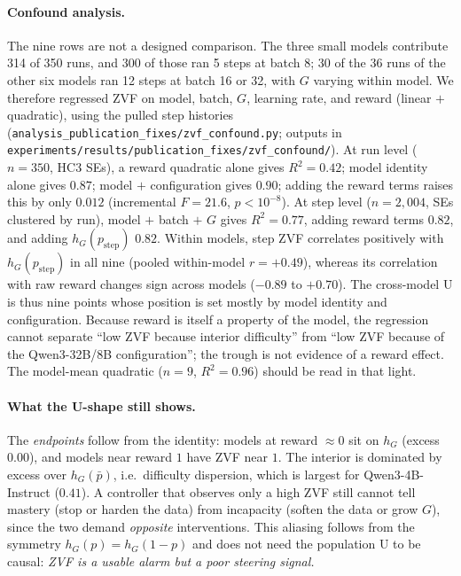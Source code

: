 \paragraph{Confound analysis.} The nine rows are not a designed comparison.
The three small models contribute 314 of 350 runs, and 300 of those ran
5 steps at batch 8; 30 of the 36 runs of the other six models ran 12 steps at
batch 16 or 32, with $G$ varying within model. We therefore regressed ZVF on
model, batch, $G$, learning rate, and reward (linear $+$ quadratic), using
the pulled step histories
(\texttt{analysis\_publication\_fixes/zvf\_confound.py}; outputs in
\texttt{experiments/results/publication\_fixes/zvf\_confound/}).
At run level ($n=350$, HC3 SEs), a reward quadratic alone gives $R^2=0.42$;
model identity alone gives $0.87$; model $+$ configuration gives $0.90$; adding
the reward terms raises this by only $0.012$ (incremental $F=21.6$,
$p<10^{-8}$). At step level ($n=2{,}004$, SEs clustered by run), model $+$
batch $+$ $G$ gives $R^2=0.77$, adding reward terms $0.82$, and adding
$h_G(p_{\mathrm{step}})$ $0.82$. Within models, step ZVF correlates positively
with $h_G(p_{\mathrm{step}})$ in all nine (pooled within-model
$r=+0.49$), whereas its correlation with raw reward changes sign across models
($-0.89$ to $+0.70$). The cross-model U is thus nine points whose
position is set mostly by model identity and configuration. Because reward
is itself a property of the model, the regression cannot separate ``low ZVF
because interior difficulty'' from ``low ZVF because of the Qwen3-32B/8B
configuration''; the trough is not evidence of a reward effect.
The model-mean quadratic ($n=9$, $R^2=0.96$) should be read in that light.

\paragraph{What the U-shape still shows.} The \emph{endpoints} follow from the
identity: models at reward $\approx0$ sit on $h_G$ (excess $0.00$), and models
near reward $1$ have ZVF near $1$. The interior is dominated by excess over
$h_G(\bar p)$, i.e.\ difficulty dispersion, which is largest for
Qwen3-4B-Instruct ($0.41$). A controller that observes only a high ZVF still
cannot tell mastery (stop or harden the data) from incapacity (soften the data
or grow $G$), since the two demand \emph{opposite} interventions. This aliasing
follows from the symmetry $h_G(p)=h_G(1-p)$ and does not need the
population U to be causal: \emph{ZVF is a usable alarm but a poor steering
signal.}

